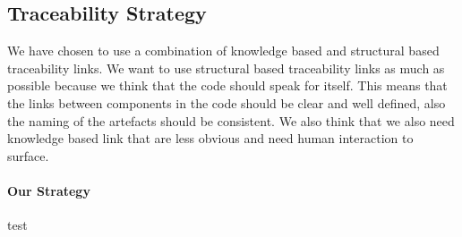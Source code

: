 \documentclass{article}
\begin{document}
\subsection{Traceability Strategy}
We have chosen to use a combination of knowledge based and structural based traceability links. We want to use structural based traceability links as much as possible because we think that the code should speak for itself. This means that the links between components in the code should be clear and well defined, also the naming of the artefacts should be consistent. We also think that we also need knowledge based link that are less obvious and need human interaction to surface.

\paragraph{Our Strategy} test
\end{document}

